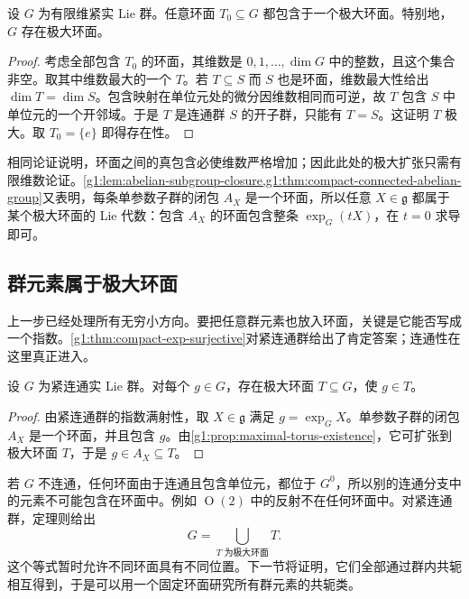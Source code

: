 \begin{proposition}\label{g1:prop:maximal-torus-existence}
	设 \(G\) 为有限维紧实 Lie 群。任意环面 \(T_0\subseteq G\) 都包含于一个极大环面。特别地，\(G\) 存在极大环面。
\end{proposition}
\begin{proof}
	考虑全部包含 \(T_0\) 的环面，其维数是 \(0,1,\ldots,\dim G\) 中的整数，且这个集合非空。取其中维数最大的一个 \(T\)。若 \(T\subseteq S\) 而 \(S\) 也是环面，维数最大性给出 \(\dim T=\dim S\)。包含映射在单位元处的微分因维数相同而可逆，故 \(T\) 包含 \(S\) 中单位元的一个开邻域。于是 \(T\) 是连通群 \(S\) 的开子群，只能有 \(T=S\)。这证明 \(T\) 极大。取 \(T_0=\{e\}\) 即得存在性。
\end{proof}

相同论证说明，环面之间的真包含必使维数严格增加；因此此处的极大扩张只需有限维数论证。\cref{g1:lem:abelian-subgroup-closure,g1:thm:compact-connected-abelian-group}又表明，每条单参数子群的闭包 \(A_X\) 是一个环面，所以任意 \(X\in\mathfrak g\) 都属于某个极大环面的 Lie 代数：包含 \(A_X\) 的环面包含整条 \(\exp_G(tX)\)，在 \(t=0\) 求导即可。

\subsection{群元素属于极大环面}
\label{g1:subsec:1902:04}
上一步已经处理所有无穷小方向。要把任意群元素也放入环面，关键是它能否写成一个指数。\cref{g1:thm:compact-exp-surjective}对紧连通群给出了肯定答案；连通性在这里真正进入。

\begin{theorem}\label{g1:thm:element-in-maximal-torus}
	设 \(G\) 为紧连通实 Lie 群。对每个 \(g\in G\)，存在极大环面 \(T\subseteq G\)，使 \(g\in T\)。
\end{theorem}
\begin{proof}
	由紧连通群的指数满射性，取 \(X\in\mathfrak g\) 满足 \(g=\exp_GX\)。单参数子群的闭包 \(A_X\) 是一个环面，并且包含 \(g\)。由\cref{g1:prop:maximal-torus-existence}，它可扩张到极大环面 \(T\)，于是 \(g\in A_X\subseteq T\)。
\end{proof}

若 \(G\) 不连通，任何环面由于连通且包含单位元，都位于 \(G^0\)，所以别的连通分支中的元素不可能包含在环面中。例如 \(\operatorname{O}(2)\) 中的反射不在任何环面中。对紧连通群，定理则给出
\[
	G=\bigcup_{T\text{ 为极大环面}}T.
\]
这个等式暂时允许不同环面具有不同位置。下一节将证明，它们全部通过群内共轭相互得到，于是可以用一个固定环面研究所有群元素的共轭类。
